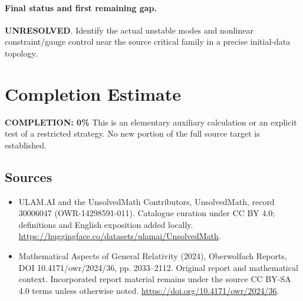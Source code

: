 \documentclass[11pt]{article}
\begin{document}
\paragraph{Final status and first remaining gap.}
\textbf{UNRESOLVED}. Identify the actual unstable modes and nonlinear constraint/gauge control near the source critical family in a precise initial-data topology.

\section{Completion Estimate}
\noindent\textbf{COMPLETION: 0\%}
This is an elementary auxiliary calculation or an explicit test of a restricted strategy. No new portion of the full source target is established.

\subsection{Sources}
\begin{itemize}
\item[\hypertarget{source:30006047:1}{S1}] ULAM.AI and the UnsolvedMath Contributors, UnsolvedMath, record 30006047 (OWR-14298591-011). Catalogue curation under CC BY 4.0; definitions and English exposition added locally.
\url{https://huggingface.co/datasets/ulamai/UnsolvedMath}.
\item[\hypertarget{source:30006047:2}{S2}] Mathematical Aspects of General Relativity (2024), Oberwolfach Reports, DOI 10.4171/owr/2024/36, pp. 2033--2112. Original report and mathematical context. Incorporated report material remains under the source CC BY-SA 4.0 terms unless otherwise noted.
\url{https://doi.org/10.4171/owr/2024/36}.
\end{itemize}
\label{end:30006047}
\end{document}
